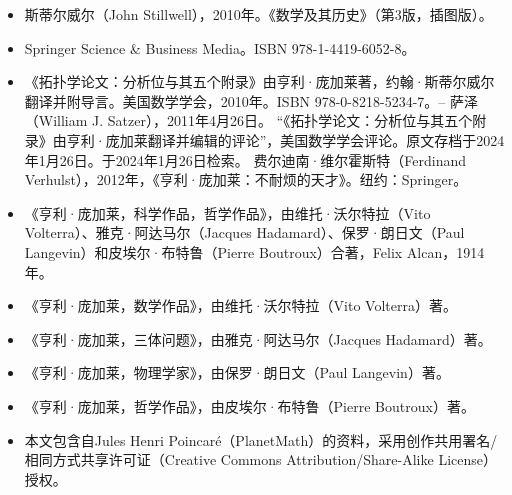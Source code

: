 \begin{itemize}
\item 斯蒂尔威尔（John Stillwell），2010年。《数学及其历史》（第3版，插图版）。\item Springer Science & Business Media。ISBN 978-1-4419-6052-8。
\item 《拓扑学论文：分析位与其五个附录》由亨利·庞加莱著，约翰·斯蒂尔威尔翻译并附导言。美国数学学会，2010年。ISBN 978-0-8218-5234-7。– 萨泽（William J. Satzer），2011年4月26日。 “《拓扑学论文：分析位与其五个附录》由亨利·庞加莱翻译并编辑的评论”，美国数学学会评论。原文存档于2024年1月26日。于2024年1月26日检索。
费尔迪南·维尔霍斯特（Ferdinand Verhulst），2012年，《亨利·庞加莱：不耐烦的天才》。纽约：Springer。
\item 《亨利·庞加莱，科学作品，哲学作品》，由维托·沃尔特拉（Vito Volterra）、雅克·阿达马尔（Jacques Hadamard）、保罗·朗日文（Paul Langevin）和皮埃尔·布特鲁（Pierre Boutroux）合著，Felix Alcan，1914年。
\item 《亨利·庞加莱，数学作品》，由维托·沃尔特拉（Vito Volterra）著。
\item 《亨利·庞加莱，三体问题》，由雅克·阿达马尔（Jacques Hadamard）著。
\item 《亨利·庞加莱，物理学家》，由保罗·朗日文（Paul Langevin）著。
\item 《亨利·庞加莱，哲学作品》，由皮埃尔·布特鲁（Pierre Boutroux）著。
\item 本文包含自Jules Henri Poincaré（PlanetMath）的资料，采用创作共用署名/相同方式共享许可证（Creative Commons Attribution/Share-Alike License）授权。
\end{itemize}